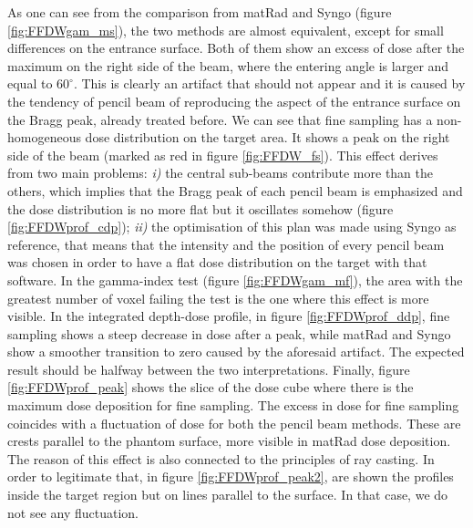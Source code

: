 \documentclass[12pt, a4paper, twoside]{book}
\begin{document}
As one can see from the comparison from matRad and Syngo (figure \ref{fig:FFDWgam_ms}), the two methods are almost equivalent, except for small differences on the entrance surface. Both of them show an excess of dose after the maximum on the right side of the beam, where the entering angle is larger and equal to $60^\circ$. This is clearly an artifact that should not appear and it is caused by the tendency of pencil beam of reproducing the aspect of the entrance surface on the Bragg peak, already treated before.
We can see that fine sampling has a non-homogeneous dose distribution on the target area. It shows a peak on the right side of the beam (marked as red in figure \ref{fig:FFDW_fs}). This effect derives from two main problems: \emph{i)} the central sub-beams contribute more than the others, which implies that the Bragg peak of each pencil beam is emphasized and the dose distribution is no more flat but it oscillates somehow (figure \ref{fig:FFDWprof_cdp}); \emph{ii)} the optimisation of this plan was made using Syngo as reference, that means that the intensity and the position of every pencil beam was chosen in order to have a flat dose distribution on the target with that software.
In the gamma-index test (figure \ref{fig:FFDWgam_mf}), the area with the greatest number of voxel failing the test is the one where this effect is more visible.
In the integrated depth-dose profile, in figure \ref{fig:FFDWprof_ddp}, fine sampling shows a steep decrease in dose after a peak, while matRad and Syngo show a smoother transition to zero caused by the aforesaid artifact. The expected result should be halfway between the two interpretations.
Finally, figure \ref{fig:FFDWprof_peak} shows the slice of the dose cube where there is the maximum dose deposition  for fine sampling. The excess in dose for fine sampling coincides with a fluctuation of dose for both the pencil beam methods. These are crests parallel to the phantom surface, more visible in matRad dose deposition. The reason of this effect is also connected to the principles of ray casting. In order to legitimate that, in figure \ref{fig:FFDWprof_peak2}, are shown the profiles inside the target region but on lines parallel to the surface. In that case, we do not see any fluctuation.
\end{document}
